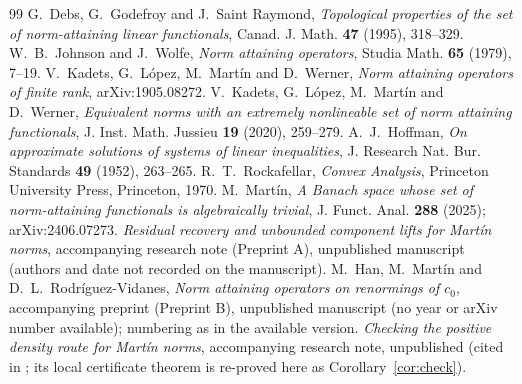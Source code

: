 \documentclass[10pt]{amsart}
\theoremstyle{definition}
\theoremstyle{remark}
\begin{document}
\begin{thebibliography}{99}
G.~Debs, G.~Godefroy and J.~Saint Raymond,
\emph{Topological properties of the set of norm-attaining linear
functionals}, Canad. J. Math. \textbf{47} (1995), 318--329.
W.~B.~Johnson and J.~Wolfe, \emph{Norm attaining operators},
Studia Math. \textbf{65} (1979), 7--19.
V.~Kadets, G.~L\'opez, M.~Mart\'in and D.~Werner,
\emph{Norm attaining operators of finite rank}, arXiv:1905.08272.
V.~Kadets, G.~L\'opez, M.~Mart\'in and D.~Werner,
\emph{Equivalent norms with an extremely nonlineable set of norm attaining
functionals}, J. Inst. Math. Jussieu \textbf{19} (2020), 259--279.
A.~J.~Hoffman, \emph{On approximate solutions of systems of linear
inequalities}, J. Research Nat. Bur. Standards \textbf{49} (1952),
263--265.
R.~T.~Rockafellar, \emph{Convex Analysis}, Princeton University Press,
Princeton, 1970.
M.~Mart\'in,
\emph{A Banach space whose set of norm-attaining functionals is
algebraically trivial}, J. Funct. Anal. \textbf{288} (2025);
arXiv:2406.07273.
\emph{Residual recovery and unbounded component lifts for Mart\'in norms},
accompanying research note (Preprint A), unpublished manuscript (authors
and date not recorded on the manuscript).
M.~Han, M.~Mart\'in and D.~L.~Rodr\'iguez-Vidanes,
\emph{Norm attaining operators on renormings of $c_0$}, accompanying
preprint (Preprint B), unpublished manuscript (no year or arXiv number
available); numbering as in the available version.
\emph{Checking the positive density route for Mart\'in norms},
accompanying research note, unpublished (cited in \cite{PrA}; its local
certificate theorem is re-proved here as Corollary~\ref{cor:check}).
\end{thebibliography}
\end{document}
